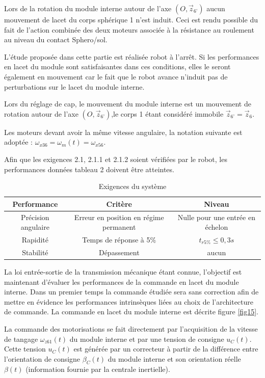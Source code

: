 Lors de la rotation du module interne autour de l’axe $(O,\overrightarrow{z}_{6’})$ aucun mouvement de lacet du corps sphérique 1 n’est induit. Ceci est rendu possible du fait de l’action combinée des deux moteurs associée à la résistance au roulement au niveau du contact Sphero/sol.

L’étude proposée dans cette partie est réalisée robot à l’arrêt. Si les performances en lacet du module sont satisfaisantes dans ces conditions, elles le seront également en mouvement car le fait que le robot avance n’induit pas de perturbations sur le lacet du module interne.

Lors du réglage de cap, le mouvement du module interne est un mouvement de rotation autour de l’axe $(O,\overrightarrow{z}_{6’})$,le corps 1 étant considéré immobile $\overrightarrow{z}_{6’}=\overrightarrow{z}_6 $.

Les moteurs devant avoir la même vitesse angulaire, la notation suivante est adoptée : $\omega_{x36}=\omega_m(t)=\omega_{x56}$.

Afin que les exigences 2.1, 2.1.1 et 2.1.2 soient vérifiées par le robot, les performances données tableau 2 doivent être atteintes. 


\begin{table}[!h]
\begin{tabular}{|c|c|c|}
\hline
Performance & Critère & Niveau \\
\hline
Précision angulaire & Erreur en position en régime permanent & Nulle pour une entrée en échelon \\
\hline
Rapidité & Temps de réponse à 5\% & $t_{r5\%}\leq 0,3s$ \\
\hline
Stabilité & Dépassement & aucun \\
\hline
\end{tabular}
\caption{Exigences du système}
\label{tab1}
\end{table}

La loi entrée-sortie de la transmission mécanique étant connue, l’objectif est maintenant d’évaluer les performances de la commande en lacet du module interne. Dans un premier temps la commande étudiée sera sans correction afin de mettre en évidence les performances intrinsèques liées au choix de l’architecture de commande. La commande en lacet du module interne est décrite figure \ref{fig15}. 

La commande des motorisations se fait directement par l’acquisition de la vitesse de tangage $\omega_{z61}(t)$ du module interne et par une tension de consigne $u_C(t)$. Cette tension $u_C(t)$ est générée par un correcteur à partir de la différence entre l’orientation de consigne $\beta_C(t)$ du module interne et son orientation réelle $\beta(t)$ (information fournie par la centrale inertielle).

